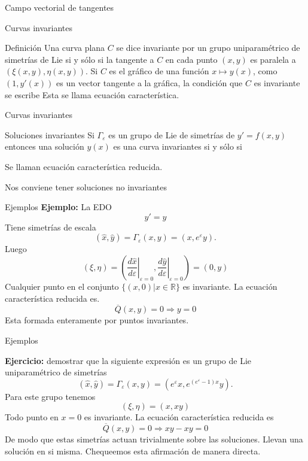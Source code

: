 \documentclass[handout,hyperref={colorlinks=true}]{beamer}
\newcommand{\rr}{\mathbb{R}}
\renewcommand{\emph}[1]{\textcolor[rgb]{1,0,0}{#1}}
\renewcommand{\epsilon}{\varepsilon}
\newcommand{\nl}{\onslide<+-> }
\begin{document}
\begin{frame}[fragile]{Campo vectorial de tangentes}


\end{frame}

\begin{frame}{Curvas invariantes}
\begin{block}{Definición}
Una curva plana $C$ se dice invariante por un grupo uniparamétrico de simetrías de Lie si y sólo si la tangente a  $C$ en cada punto $(x,y)$ es paralela a $(\xi(x,y),\eta(x,y))$. Si $C$ es el gráfico de una función $x\mapsto y(x)$, como $(1,y'(x))$ es un vector tangente a la gráfica, la condición que $C$ es invariante se escribe
Esta se llama \emph{ecuación característica}.
\end{block} 


\end{frame}


\begin{frame}{Curvas invariantes}
\nl \begin{block}{Soluciones invariantes}
Si $\Gamma_{\epsilon}$ es un grupo de Lie de simetrías de $y'=f(x,y)$ entonces una solución $y(x)$ es una curva invariantes si y sólo si

Se llaman \emph{ecuación característica reducida}.
\end{block} 

\nl \emph{Nos conviene tener soluciones no invariantes}

\end{frame}


\begin{frame}{Ejemplos}
\textbf{Ejemplo:} La EDO
\[y'=y\]
Tiene simetrías de escala
\[(\hat{x},\hat{y})=\Gamma_{\epsilon}(x,y)=(x,e^{\epsilon}y).\]
Luego 
\[(\xi,\eta)=\left(\left.\frac{d\hat{x}}{d\epsilon}\right|_{\epsilon=0}, \left.\frac{d\hat{y}}{d\epsilon}\right|_{\epsilon=0}   \right)=(0,y)\]
Cualquier punto en el conjunto $\{(x,0)|x\in\rr\}$  es invariante. La ecuación característica reducida es.
\[\overline{Q}(x,y)=0\Rightarrow y=0\]
Esta formada enteramente por puntos invariantes.

\end{frame}


\begin{frame}{Ejemplos}

\textbf{Ejercicio:} demostrar que la siguiente expresión es un grupo de Lie uniparamétrico de simetrías
\[(\hat{x},\hat{y})=\Gamma_{\epsilon}(x,y)=(e^{\epsilon}x,e^{(e^{\epsilon}-1)x}y).\]
Para este grupo tenemos
\[(\xi,\eta)=(x,xy)\]
Todo punto en $x=0$ es invariante. La ecuación característica reducida es
\[\overline{Q}(x,y)=0\Rightarrow xy-xy=0\]
De modo que estas simetrías actuan trivialmente sobre las soluciones. Llevan una solución en si misma. Chequeemos esta afirmación de manera directa. 


\end{frame}
\end{document}
